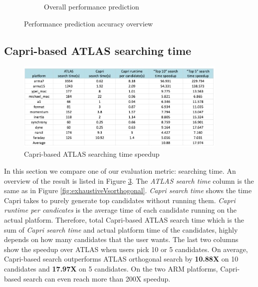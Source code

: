 \begin{figure}[bhp]
\begin{subfigure}[b]{1.0\linewidth}
      \caption{Overall performance prediction}
      \label{fig:overall_perf}
    \end{subfigure}
    \caption{Performance prediction accuracy overview}
  \end{figure}



  \subsection{Capri-based ATLAS searching time}
  \label{sec:capri_atlas_searching}
  \begin{figure}[tbhp]
    \centering
    \includegraphics[width=0.9\textwidth]{images/timespeedup.png}
    \caption{Capri-based ATLAS searching time speedup}
    \label{fig:search_time}
  \end{figure}

  In this section we compare one of our evaluation metric: searching time. An overview of the result is listed in
  Figure \ref{fig:search_time}. The \textit{ATLAS search time} column is the same as in Figure \ref{fig:exhaustiveVsorthogonal}.
  \textit{Capri search time} shows the time Capri takes to purely generate top candidates without running them.
  \textit{Capri runtime per candicates} is the average time of each candidate running on the actual platform.
  Therefore, total Capri-based ATLAS search time which is the sum of \textit{Capri search time} and actual platform time of the candidates,
  highly depends on how many candidates that the user wants. The last two columns show the speedup over ATLAS when users pick
  10 or 5 candidates. On average, Capri-based search outperforms ATLAS orthogonal search by \textbf{10.88X} on 10 candidates and \textbf{17.97X} on
  5 candidates. On the two ARM platforms, Capri-based search can even reach more than 200X speedup.


